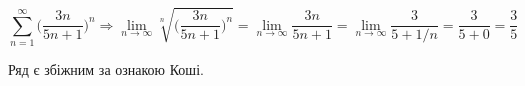 {}

$$
\sum_{n=1}^\infty \Big(\dfrac{3n}{5n+1}\Big)^n
\Rightarrow
  \lim_{n \to \infty} \sqrt[n]{ \Big(\dfrac{3n}{5n+1}\Big)^n }
= \lim_{n \to \infty} \dfrac{3n}{5n+1}
= \lim_{n \to \infty} \dfrac{3}{5+1/n}
= \dfrac{3}{5+0}
= \dfrac{3}{5}
$$

\begin{center}Ряд є збіжним за ознакою Коші.\end{center}

